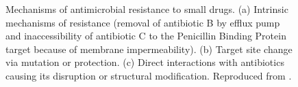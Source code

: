 \begin{figure}[h]
\begin{center}
\caption[Mechanisms of antimicrobial resistance to small drugs]{Mechanisms of antimicrobial resistance to small drugs. (a) Intrinsic mechanisms of resistance (removal of antibiotic B by efflux pump and inaccessibility of antibiotic C to the Penicillin Binding Protein target because of membrane impermeability). (b) Target site change via mutation or protection. (c) Direct interactions with antibiotics causing its disruption or structural modification. Reproduced from \citet{Blair2014}.} \label{fig:amr}
\end{center}
\end{figure}

